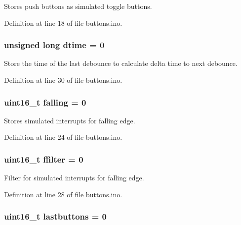 Stores push buttons as simulated toggle buttons. 



Definition at line 18 of file buttons.\+ino.

\subsubsection[{\texorpdfstring{dtime}{dtime}}]{\setlength{\rightskip}{0pt plus 5cm}unsigned long dtime = 0}\hypertarget{group__buttons_ga94921f7ca95d518d3deabb1da432c2fb}{}\label{group__buttons_ga94921f7ca95d518d3deabb1da432c2fb}


Store the time of the last debounce to calculate delta time to next debounce. 



Definition at line 30 of file buttons.\+ino.

\subsubsection[{\texorpdfstring{falling}{falling}}]{\setlength{\rightskip}{0pt plus 5cm}uint16\+\_\+t falling = 0}\hypertarget{group__buttons_ga1861b594f36400f6c17b1f65b2565816}{}\label{group__buttons_ga1861b594f36400f6c17b1f65b2565816}


Stores simulated interrupts for falling edge. 



Definition at line 24 of file buttons.\+ino.

\subsubsection[{\texorpdfstring{ffilter}{ffilter}}]{\setlength{\rightskip}{0pt plus 5cm}uint16\+\_\+t ffilter = 0}\hypertarget{group__buttons_gaaa75cede053f94cf46d7420556af1505}{}\label{group__buttons_gaaa75cede053f94cf46d7420556af1505}


Filter for simulated interrupts for falling edge. 



Definition at line 28 of file buttons.\+ino.

\subsubsection[{\texorpdfstring{lastbuttons}{lastbuttons}}]{\setlength{\rightskip}{0pt plus 5cm}uint16\+\_\+t lastbuttons = 0}\hypertarget{group__buttons_gac23a04180ca7609f571853499faae915}{}\label{group__buttons_gac23a04180ca7609f571853499faae915}


